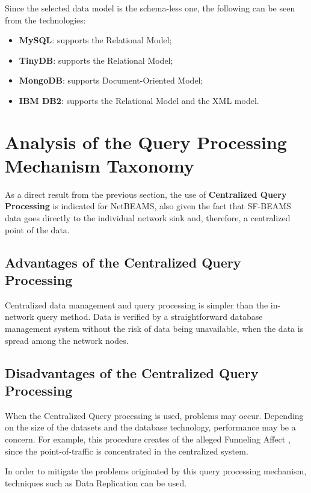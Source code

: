 Since the selected data model is the schema-less one, the following can be seen
from the technologies:

\begin{itemize}
  \item \textbf{MySQL}: supports the Relational Model;
  \item \textbf{TinyDB}: supports the Relational Model; 
  \item \textbf{MongoDB}: supports Document-Oriented Model;
  \item \textbf{IBM DB2}: supports the Relational Model and the XML model.
\end{itemize}

\section{Analysis of the Query Processing Mechanism Taxonomy}

As a direct result from the previous section, the use of \textbf{Centralized Query
Processing} is indicated for NetBEAMS, also given the fact that SF-BEAMS data
goes directly to the individual network sink and, therefore, a centralized
point of the data.

\subsection{Advantages of the Centralized Query Processing}

Centralized data management and query processing is simpler than the in-network
query method. Data is verified by a straightforward database management system
without the risk of data being unavailable, when the data is spread among the
network nodes.

\subsection{Disadvantages of the Centralized Query Processing}

When the Centralized Query processing is used, problems may occur. Depending on
the size of the datasets and the database technology, performance may be a
concern. For example, this procedure creates of the alleged Funneling Affect
\cite{sn-storage04}, since the point-of-traffic is concentrated in the
centralized system.

In order to mitigate the problems originated by this query processing
mechanism, techniques such as Data Replication can be used.

